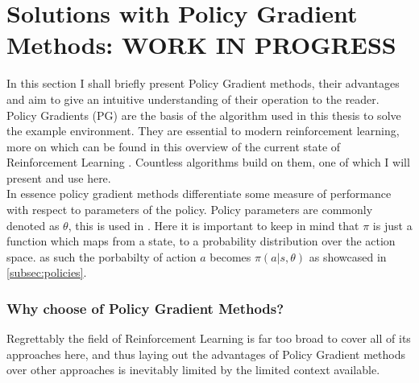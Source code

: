 \newpage
\chapter{Solutions with Policy Gradient Methods: WORK IN PROGRESS}\label{chap:policy_gradient}
\noindent
In this section I shall briefly present Policy Gradient methods, their advantages and aim to give an intuitive understanding of their operation to the reader.
Policy Gradients (PG) are the basis of the algorithm used in this thesis to solve the example environment. They are essential to modern reinforcement learning, more on which can be found in this overview of the current state of Reinforcement Learning \cite{grigsby_overview_2018}. Countless algorithms build on them, one of which I will present and use here.
\\ In essence policy gradient methods differentiate some measure of performance with respect to parameters of the policy. Policy parameters are commonly denoted as $\theta$, this is used in \cite{sutton_reinforcement_2018}. Here it is important to keep in mind that $\pi$ is just a function which maps from a state, to a probability distribution over the action space. as such the porbabilty of action $a$ becomes $\pi(a|s, \theta)$ as showcased in \ref{subsec:policies}.

\subsection{Why choose of Policy Gradient Methods?}\label{subsec:advantages_of_policy_gradient}
\noindent
Regrettably the field of Reinforcement Learning is far too broad to cover all of its approaches here, and thus laying out the advantages of Policy Gradient methods over other approaches is inevitably limited by the limited context available. 